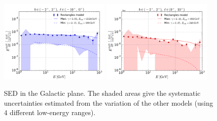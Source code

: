 \begin{figure}[h]
\centering
 \includegraphics[width=0.48\textwidth]{plots/Summary_SED_b=0_l=-5.pdf}
 \includegraphics[width=0.48\textwidth]{plots/Summary_SED_b=0_l=5.pdf}
 \caption{SED in the Galactic plane. The shaded areas give the systematic uncertainties estimated from the variation of the other models (using 4 different low-energy ranges).}
 \label{fig:spec_summary}
\end{figure}


